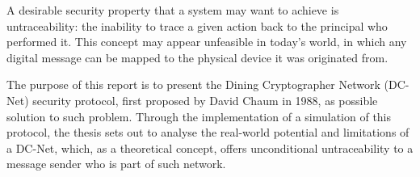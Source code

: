 A desirable security property that a system may want to achieve is untraceability: the inability to trace a given action back to the principal who performed it. This concept may appear unfeasible in today's world, in which any digital message can be mapped to the physical device it was originated from.

The purpose of this report is to present the Dining Cryptographer Network (DC-Net) security protocol, first proposed by David Chaum in 1988, as possible solution to such problem. Through the implementation of a simulation of this protocol, the thesis sets out to analyse the real-world potential and limitations of a DC-Net, which, as a theoretical concept, offers unconditional untraceability to a message sender who is part of such network.
